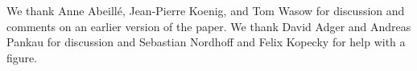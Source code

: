 \documentclass[output=paper
                ,modfonts
                ,nonflat
	        ,collection
	        ,collectionchapter
	        ,collectiontoclongg
 	        ,biblatex
                ,babelshorthands
                ,newtxmath
                ,draftmode
                ,colorlinks, citecolor=brown
]{./langsci/langscibook}
\begin{document}
We thank Anne Abeillé, Jean-Pierre Koenig, and Tom Wasow for discussion and comments on an earlier
version of the paper. We thank David Adger and Andreas Pankau for discussion and Sebastian Nordhoff
and Felix Kopecky for help with a figure.













\end{document}
